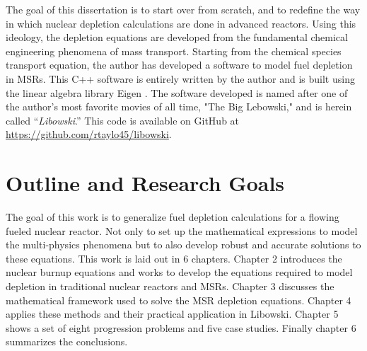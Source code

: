 The goal of this dissertation is to start over from scratch, and to redefine the way in which nuclear depletion calculations are done in advanced reactors. Using this ideology, the depletion equations are developed from the fundamental chemical engineering phenomena of mass transport. Starting from the chemical species transport equation, the author has developed a software to model fuel depletion in MSRs. This C++ software is entirely written by the author and is built using the linear algebra library Eigen \cite{eigen}. The software developed is named after one of the author's most favorite movies of all time, "The Big Lebowski," and is herein called ``\textit{Libowski}.'' This code is available on GitHub at \href{https://github.com/rtaylo45/libowski}{{\color{blue}https://github.com/rtaylo45/libowski}}.

\section{Outline and Research Goals}

The goal of this work is to generalize fuel depletion calculations for a flowing fueled nuclear reactor. Not only to set up the mathematical expressions to model the multi-physics phenomena but to also develop robust and accurate solutions to these equations. This work is laid out in 6 chapters. Chapter 2 introduces the nuclear burnup equations and works to develop the equations required to model depletion in traditional nuclear reactors and MSRs. Chapter 3 discusses the mathematical framework used to solve the MSR depletion equations. Chapter 4 applies these methods and their practical application in Libowski. Chapter 5 shows a set of eight progression problems and five case studies. Finally chapter 6 summarizes the conclusions. 
